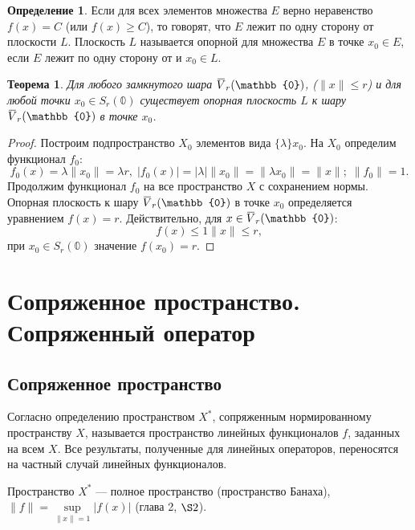 \documentclass[12pt,a4paper,titlepage,oneside]{book}
\newcommand{\overbar}[1]{\mkern 1.5mu\overline{\mkern-1.5mu#1\mkern-1.5mu}\mkern 1.5mu}
\theoremstyle{definition}
\newtheorem*{definition}{Определение}
\theoremstyle{plain}
\newtheorem*{theorem}{Теорема}
\theoremstyle{break}
\theoremstyle{remark}
\theoremstyle{remark}
\theoremstyle{remark}
\theoremstyle{remark}
\theoremstyle{plain}
\theoremstyle{plain}
\begin{document}
\begin {definition}
Если для всех элементов множества $E$ верно неравенство $f(x)=C$ (или $f(x) \geqslant C$), то говорят, что $E$ лежит по одну сторону от плоскости $L$. Плоскость $L$ называется опорной для множества $E$ в точке $x_0 \in E$, если $E$ лежит по одну сторону от и $x_0 \in L$.
\end {definition}

\begin{theorem}
Для любого замкнутого шара $\overbar{V}_r(\mathbb{0})$, ($\lVert x \rVert \leqslant r$) и для любой точки $x_0 \in S_r(\mathbb{0})$ существует опорная плоскость $L$ к шару $\overbar{V}_r(\mathbb{0})$ в точке $x_0$.
\end{theorem}

\begin{proof}
Построим подпространство $X_0$ элементов вида $\{ \lambda \}x_0$. На $X_0$ определим функционал $f_0$:
\begin{equation*}
f_0(x)=\lambda \lVert x_0 \rVert = \lambda r, \; |f_0(x)|=|\lambda|\lVert x_0 \rVert=\lVert \lambda x_0 \rVert=\lVert x \rVert; \; \lVert f_0 \rVert=1.
\end{equation*}
Продолжим функционал $f_0$ на все пространство $X$ с сохранением нормы. Опорная плоскость к шару $\overbar{V}_r(\mathbb{0})$ в точке $x_0$ определяется уравнением $f(x)=r$. Действительно, для $x \in \overbar{V}_r(\mathbb{0})$:
\begin{equation*}
f(x)\leqslant 1 \lVert x \rVert \leqslant r,
\end{equation*}
при $x_0 \in S_r(\mathbb{0})$ значение $f(x_0)=r$.
\qedhere
\end{proof}

\chapter{Сопряженное пространство. Сопряженный оператор}

\section{Сопряженное пространство}

Согласно определению пространством $X^*$, сопряженным нормированному пространству $X$, называется пространство линейных функционалов $f$, заданных на всем $X$. Все результаты, полученные для линейных операторов, переносятся на частный случай линейных функционалов.

Пространство $X^*$ --- полное пространство (пространство Банаха), $\lVert f\rVert = \sup\limits_{\lVert x\rVert = 1}\lvert f(x)\rvert$ (глава 2, $\S 2$).
\end{document}
